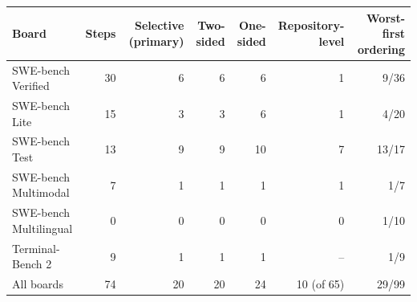 \begin{tabular}{lrrrrrr}
\toprule
Board & Steps & Selective (primary) & Two-sided & One-sided & Repository-level & Worst-first ordering \\
\midrule
SWE-bench Verified & 30 & 6 & 6 & 6 & 1 & 9/36 \\
SWE-bench Lite & 15 & 3 & 3 & 6 & 1 & 4/20 \\
SWE-bench Test & 13 & 9 & 9 & 10 & 7 & 13/17 \\
SWE-bench Multimodal & 7 & 1 & 1 & 1 & 1 & 1/7 \\
SWE-bench Multilingual & 0 & 0 & 0 & 0 & 0 & 1/10 \\
Terminal-Bench 2 & 9 & 1 & 1 & 1 & -- & 1/9 \\
\midrule
All boards & 74 & 20 & 20 & 24 & 10 (of 65) & 29/99 \\
\bottomrule
\end{tabular}
